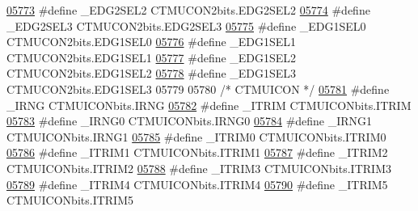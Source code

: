\begin{DoxyCode}
\hypertarget{a00015_source_l05773}{}\hyperlink{a00015_a8f7e266b2ce913ae4cbfea2be943c2d5}{05773} \textcolor{preprocessor}{#define \_EDG2SEL2 CTMUCON2bits.EDG2SEL2}
\hypertarget{a00015_source_l05774}{}\hyperlink{a00015_a8d530ac7fdee290ca241d6a2902784a2}{05774} \textcolor{preprocessor}{#define \_EDG2SEL3 CTMUCON2bits.EDG2SEL3}
\hypertarget{a00015_source_l05775}{}\hyperlink{a00015_ad567073f637390a8ab590bd417ff442c}{05775} \textcolor{preprocessor}{#define \_EDG1SEL0 CTMUCON2bits.EDG1SEL0}
\hypertarget{a00015_source_l05776}{}\hyperlink{a00015_ab3efc64d1f960c5fe8504a0f3f81f608}{05776} \textcolor{preprocessor}{#define \_EDG1SEL1 CTMUCON2bits.EDG1SEL1}
\hypertarget{a00015_source_l05777}{}\hyperlink{a00015_a77c6d22d23173cb001291d6304ac0645}{05777} \textcolor{preprocessor}{#define \_EDG1SEL2 CTMUCON2bits.EDG1SEL2}
\hypertarget{a00015_source_l05778}{}\hyperlink{a00015_a514fe90dd2e84c565c72c3037bfcb1c3}{05778} \textcolor{preprocessor}{#define \_EDG1SEL3 CTMUCON2bits.EDG1SEL3}
05779 
05780 \textcolor{comment}{/* CTMUICON */}
\hypertarget{a00015_source_l05781}{}\hyperlink{a00015_ac106fa1060b72a6eaf5f9e377519a702}{05781} \textcolor{preprocessor}{#define \_IRNG CTMUICONbits.IRNG}
\hypertarget{a00015_source_l05782}{}\hyperlink{a00015_a49004872342164376c6113a04ffc548e}{05782} \textcolor{preprocessor}{#define \_ITRIM CTMUICONbits.ITRIM}
\hypertarget{a00015_source_l05783}{}\hyperlink{a00015_a39cdd2c445cdf6ffde3d061c4cb1166d}{05783} \textcolor{preprocessor}{#define \_IRNG0 CTMUICONbits.IRNG0}
\hypertarget{a00015_source_l05784}{}\hyperlink{a00015_a72af5ef6b5aa5fd79389a1f0190bcff3}{05784} \textcolor{preprocessor}{#define \_IRNG1 CTMUICONbits.IRNG1}
\hypertarget{a00015_source_l05785}{}\hyperlink{a00015_ac86a6f277d895c520ece1423079bdcf7}{05785} \textcolor{preprocessor}{#define \_ITRIM0 CTMUICONbits.ITRIM0}
\hypertarget{a00015_source_l05786}{}\hyperlink{a00015_a43dde7ec808fb8703111a29725a0db3d}{05786} \textcolor{preprocessor}{#define \_ITRIM1 CTMUICONbits.ITRIM1}
\hypertarget{a00015_source_l05787}{}\hyperlink{a00015_ae6d71dd7b8bd5ac68a06536127435b5b}{05787} \textcolor{preprocessor}{#define \_ITRIM2 CTMUICONbits.ITRIM2}
\hypertarget{a00015_source_l05788}{}\hyperlink{a00015_add368b03e9d29e56b423a99057d8a8d4}{05788} \textcolor{preprocessor}{#define \_ITRIM3 CTMUICONbits.ITRIM3}
\hypertarget{a00015_source_l05789}{}\hyperlink{a00015_a8f433458adb0b2738292ef045f55f9cd}{05789} \textcolor{preprocessor}{#define \_ITRIM4 CTMUICONbits.ITRIM4}
\hypertarget{a00015_source_l05790}{}\hyperlink{a00015_adea38fa927f3d5b6b91c1cbeb8c78c9b}{05790} \textcolor{preprocessor}{#define \_ITRIM5 CTMUICONbits.ITRIM5}

\end{DoxyCode}
